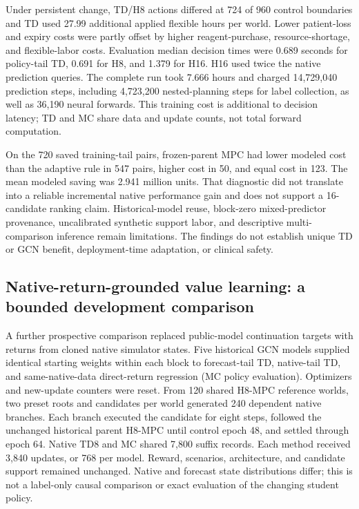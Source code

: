 \documentclass[preprint,review,12pt]{elsarticle}
\begin{document}
Under persistent change, TD/H8 actions differed at 724 of 960 control boundaries
and TD used 27.99 additional applied flexible hours per world. Lower patient-loss
and expiry costs were partly offset by higher reagent-purchase, resource-shortage,
and flexible-labor costs. Evaluation median decision times were 0.689 seconds
for policy-tail TD, 0.691 for H8, and 1.379 for H16. H16 used twice the native
prediction queries. The complete run took 7.666 hours and charged 14,729,040
prediction steps, including 4,723,200 nested-planning steps for label collection,
as well as 36,190 neural forwards. This training cost is additional to decision
latency; TD and MC share data and update counts, not total forward computation.

On the 720 saved training-tail pairs, frozen-parent MPC had lower modeled cost
than the adaptive rule in 547 pairs, higher cost in 50, and equal cost in 123.
The mean modeled saving was 2.941 million units. That diagnostic did not translate
into a reliable incremental native performance gain and does not support a
16-candidate ranking claim. Historical-model reuse, block-zero mixed-predictor
provenance, uncalibrated synthetic support labor, and descriptive multi-comparison
inference remain limitations. The findings do not establish unique TD or GCN
benefit, deployment-time adaptation, or clinical safety.

\subsection{Native-return-grounded value learning: a bounded development comparison}
\label{sec:native-tail-development}
A further prospective comparison replaced public-model continuation targets
with returns from cloned native simulator states. Five historical GCN models
supplied identical starting weights within each block to forecast-tail TD,
native-tail TD, and same-native-data direct-return regression (MC policy
evaluation). Optimizers and new-update counters were reset. From 120 shared
H8-MPC reference worlds, two preset roots and candidates per world generated
240 dependent native branches. Each branch executed the candidate for eight
steps, followed the unchanged historical parent H8-MPC until control epoch 48,
and settled through epoch 64. Native TD8 and MC shared 7,800 suffix records.
Each method received 3,840 updates, or 768 per model. Reward, scenarios,
architecture, and candidate support remained unchanged. Native and forecast
state distributions differ; this is not a label-only causal comparison or
exact evaluation of the changing student policy.
\end{document}
